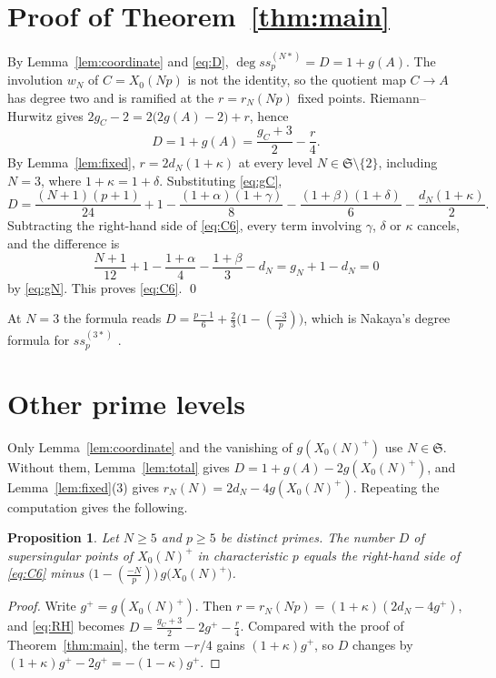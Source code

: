 \documentclass[11pt,a4paper]{article}
\newtheorem{proposition}[theorem]{Proposition}
\theoremstyle{remark}\newtheorem{remark}[theorem]{Remark}
\numberwithin{equation}{section}
\newcommand{\leg}[2]{\left(\frac{#1}{#2}\right)}
\begin{document}
\section{Proof of Theorem~\ref{thm:main}}
By Lemma~\ref{lem:coordinate} and \eqref{eq:D}, $\deg ss_p^{(N*)}=D=1+g(A)$. The involution $w_N$ of $C=X_0(Np)$ is not the identity, so the quotient map $C\to A$ has degree two and is ramified at the $r=r_N(Np)$ fixed points. Riemann--Hurwitz gives $2g_C-2=2\bigl(2g(A)-2\bigr)+r$, hence
\begin{equation}\label{eq:RH}
D=1+g(A)=\frac{g_C+3}2-\frac r4.
\end{equation}
By Lemma~\ref{lem:fixed}, $r=2d_N(1+\kappa)$ at every level $N\in\mathfrak S\setminus\{2\}$, including $N=3$, where $1+\kappa=1+\delta$. Substituting \eqref{eq:gC},
\[
D=\frac{(N+1)(p+1)}{24}+1-\frac{(1+\alpha)(1+\gamma)}8-\frac{(1+\beta)(1+\delta)}6-\frac{d_N(1+\kappa)}2.
\]
Subtracting the right-hand side of \eqref{eq:C6}, every term involving $\gamma$, $\delta$ or $\kappa$ cancels, and the difference is
\[
\frac{N+1}{12}+1-\frac{1+\alpha}4-\frac{1+\beta}3-d_N=g_N+1-d_N=0
\]
by \eqref{eq:gN}. This proves \eqref{eq:C6}. \qed

At $N=3$ the formula reads $D=\frac{p-1}6+\frac23\bigl(1-\leg{-3}{p}\bigr)$, which is Nakaya's degree formula for $ss_p^{(3*)}$ \cite{Nakaya}.

\section{Other prime levels}
Only Lemma~\ref{lem:coordinate} and the vanishing of $g(X_0(N)^+)$ use $N\in\mathfrak S$. Without them, Lemma~\ref{lem:total} gives $D=1+g(A)-2g(X_0(N)^+)$, and Lemma~\ref{lem:fixed}(3) gives $r_N(N)=2d_N-4g(X_0(N)^+)$. Repeating the computation gives the following.

\begin{proposition}\label{prop:general}
Let $N\geq5$ and $p\geq5$ be distinct primes. The number $D$ of supersingular points of $X_0(N)^+$ in characteristic $p$ equals the right-hand side of \eqref{eq:C6} minus $\bigl(1-\leg{-N}{p}\bigr)\,g\bigl(X_0(N)^+\bigr)$.
\end{proposition}
\begin{proof}
Write $g^+=g(X_0(N)^+)$. Then $r=r_N(Np)=(1+\kappa)(2d_N-4g^+)$, and \eqref{eq:RH} becomes $D=\frac{g_C+3}2-2g^+-\frac{r}{4}$. Compared with the proof of Theorem~\ref{thm:main}, the term $-r/4$ gains $(1+\kappa)g^+$, so $D$ changes by $(1+\kappa)g^+-2g^+=-(1-\kappa)g^+$.
\end{proof}
\end{document}
